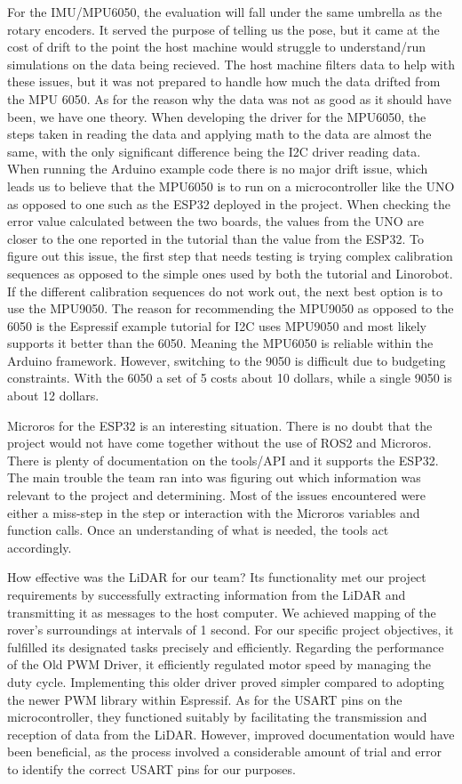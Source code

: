 \documentclass[conference]{IEEEtran}
\begin{document}
For the IMU/MPU6050, the evaluation will fall under the same umbrella as the rotary encoders. It served the purpose of telling us the pose, but it came at the cost of drift to the point the host machine would struggle to understand/run simulations on the data being recieved. The host machine filters data to help with these issues, but it was not prepared to handle how much the data drifted from the MPU 6050. As for the reason why the data was not as good as it should have been, we have one theory. When developing the driver for the MPU6050, the steps taken in reading the data and applying math to the data are almost the same, with the only significant difference being the I2C driver reading data. When running the Arduino example code there is no major drift issue, which leads us to believe that the MPU6050 is to run on a microcontroller like the UNO as opposed to one such as the ESP32 deployed in the project. When checking the error value calculated between the two boards, the values from the UNO are closer to the one reported in the tutorial than the value from the ESP32. To figure out this issue, the first step that needs testing is trying complex calibration sequences as opposed to the simple ones used by both the tutorial and Linorobot. If the different calibration sequences do not work out, the next best option is to use the MPU9050. The reason for recommending the MPU9050 as opposed to the 6050 is the Espressif example tutorial for I2C uses MPU9050 and most likely supports it better than the 6050. Meaning the MPU6050 is reliable within the Arduino framework. However, switching to the 9050 is difficult due to budgeting constraints. With the 6050 a set of 5 costs about 10 dollars, while a single 9050 is about 12 dollars.

Microros for the ESP32 is an interesting situation. There is no doubt that the project would not have come together without the use of ROS2 and Microros. There is plenty of documentation on the tools/API and it supports the ESP32. The main trouble the team ran into was figuring out which information was relevant to the project and determining. Most of the issues encountered were either a miss-step in the step or interaction with the Microros variables and function calls. Once an understanding of what is needed, the tools act accordingly.

How effective was the LiDAR for our team? Its functionality met our project requirements by successfully extracting information from the LiDAR and transmitting it as messages to the host computer. We achieved mapping of the rover's surroundings at intervals of 1 second. For our specific project objectives, it fulfilled its designated tasks precisely and efficiently.
Regarding the performance of the Old PWM Driver, it efficiently regulated motor speed by managing the duty cycle. Implementing this older driver proved simpler compared to adopting the newer PWM library within Espressif.
As for the USART pins on the microcontroller, they functioned suitably by facilitating the transmission and reception of data from the LiDAR. However, improved documentation would have been beneficial, as the process involved a considerable amount of trial and error to identify the correct USART pins for our purposes.
\end{document}
